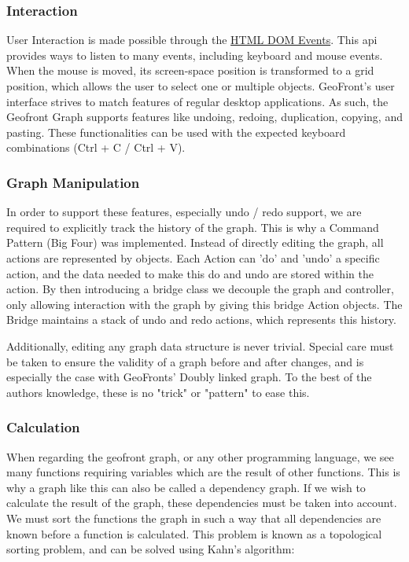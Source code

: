 \subsubsection{ Interaction }
User Interaction is made possible through the \href{https://developer.mozilla.org/en-US/docs/web/api/event}{HTML DOM Events}. 
This api provides ways to listen to many events, including keyboard and mouse events. 
When the mouse is moved, its screen-space position is transformed to a grid position, which allows the user to select one or multiple objects. 
GeoFront's user interface strives to match features of regular desktop applications. As such, the Geofront Graph supports features like undoing, redoing, duplication, copying, and pasting. These functionalities can be used with the expected keyboard combinations (Ctrl + C / Ctrl + V).

\subsubsection*{ Graph Manipulation }
In order to support these features, especially undo / redo support, we are required to explicitly track the history of the graph. 
This is why a Command Pattern (Big Four) was implemented.
Instead of directly editing the graph, all actions are represented by  objects. 
Each Action can 'do' and 'undo' a specific action, and the data needed to make this do and undo are stored within the action. 
By then introducing a bridge class we decouple the graph and controller, only allowing interaction with the graph by giving this bridge Action objects. The Bridge maintains a stack of undo and redo actions, which represents this history.  

Additionally, editing any graph data structure is never trivial. 
Special care must be taken to ensure the validity of a graph before and after changes, and is especially the case with GeoFronts' Doubly linked graph. 
To the best of the authors knowledge, these is no "trick" or "pattern" to ease this.
   
\subsubsection*{Calculation}
When regarding the geofront graph, or any other programming language, we see many functions requiring variables which are the result of other functions. 
This is why a graph like this can also be called a dependency graph. 
If we wish to calculate the result of the graph, these dependencies must be taken into account. We must sort the functions the graph in such a way that all dependencies are known before a function is calculated.
This problem is known as a topological sorting problem, and can be solved using Kahn's algorithm: 

